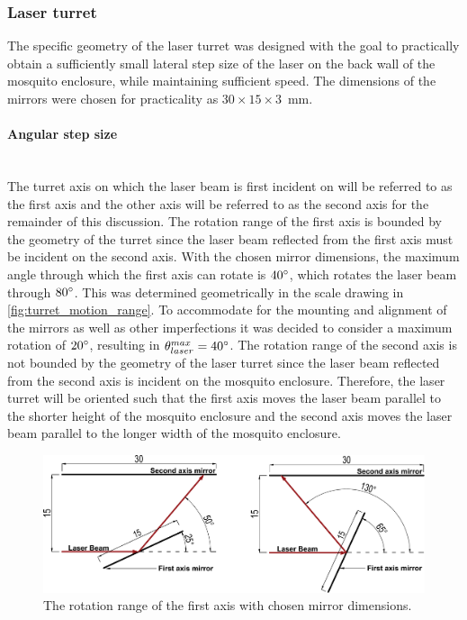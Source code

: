 \subsubsection{Laser turret}\label{subsubsec:laser_turret_design}
The specific geometry of the laser turret was designed with the goal to practically obtain a sufficiently small lateral step size of the laser on the back wall of the mosquito enclosure, while maintaining sufficient speed. The dimensions of the mirrors were chosen for practicality as $30 \times 15 \times 3$~mm.


\label{par:angular_step_size}
\paragraph{Angular step size}\mbox{}\\
The turret axis on which the laser beam is first incident on will be referred to as the first axis and the other axis will be referred to as the second axis for the remainder of this discussion. The rotation range of the first axis is bounded by the geometry of the turret since the laser beam reflected from the first axis must be incident on the second axis. With the chosen mirror dimensions, the maximum angle through which the first axis can rotate is $40^{\circ}$, which rotates the laser beam through $80^{\circ}$. This was determined geometrically in the scale drawing in \autoref{fig:turret_motion_range}. To accommodate for the mounting and alignment of the mirrors as well as other imperfections it was decided to consider a maximum rotation of $20^{\circ}$, resulting in $\theta_{laser}^{max} = 40^{\circ}$. The rotation range of the second axis is not bounded by the geometry of the laser turret since the laser beam reflected from the second axis is incident on the mosquito enclosure. Therefore, the laser turret will be oriented such that the first axis moves the laser beam parallel to the shorter height of the mosquito enclosure and the second axis moves the laser beam parallel to the longer width of the mosquito enclosure.
\begin{figure}[!htb]
  \centering
  \includegraphics[width=\textwidth]{figures/anton hoeke.pdf}
  \caption{The rotation range of the first axis with chosen mirror dimensions.}
  \label{fig:turret_motion_range}
\end{figure}

